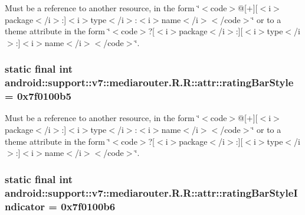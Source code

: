 Must be a reference to another resource, in the form \char`\"{}$<$code$>$@\mbox{[}+\mbox{]}\mbox{[}$<$i$>$package$<$/i$>$:\mbox{]}$<$i$>$type$<$/i$>$:$<$i$>$name$<$/i$>$$<$/code$>$\char`\"{} or to a theme attribute in the form \char`\"{}$<$code$>$?\mbox{[}$<$i$>$package$<$/i$>$:\mbox{]}\mbox{[}$<$i$>$type$<$/i$>$:\mbox{]}$<$i$>$name$<$/i$>$$<$/code$>$\char`\"{}. \hypertarget{classandroid_1_1support_1_1v7_1_1mediarouter_1_1_r_1_1attr_63ffafc6d4fcc4ad1c88e295658b8276}{
\subsubsection[{ratingBarStyle}]{\setlength{\rightskip}{0pt plus 5cm}static final int android::support::v7::mediarouter.R.R::attr::ratingBarStyle = 0x7f0100b5}}
\label{classandroid_1_1support_1_1v7_1_1mediarouter_1_1_r_1_1attr_63ffafc6d4fcc4ad1c88e295658b8276}


Must be a reference to another resource, in the form \char`\"{}$<$code$>$@\mbox{[}+\mbox{]}\mbox{[}$<$i$>$package$<$/i$>$:\mbox{]}$<$i$>$type$<$/i$>$:$<$i$>$name$<$/i$>$$<$/code$>$\char`\"{} or to a theme attribute in the form \char`\"{}$<$code$>$?\mbox{[}$<$i$>$package$<$/i$>$:\mbox{]}\mbox{[}$<$i$>$type$<$/i$>$:\mbox{]}$<$i$>$name$<$/i$>$$<$/code$>$\char`\"{}. \hypertarget{classandroid_1_1support_1_1v7_1_1mediarouter_1_1_r_1_1attr_ad4cac931c538f5a0abc85455529a66a}{
\subsubsection[{ratingBarStyleIndicator}]{\setlength{\rightskip}{0pt plus 5cm}static final int android::support::v7::mediarouter.R.R::attr::ratingBarStyleIndicator = 0x7f0100b6}}
\label{classandroid_1_1support_1_1v7_1_1mediarouter_1_1_r_1_1attr_ad4cac931c538f5a0abc85455529a66a}


